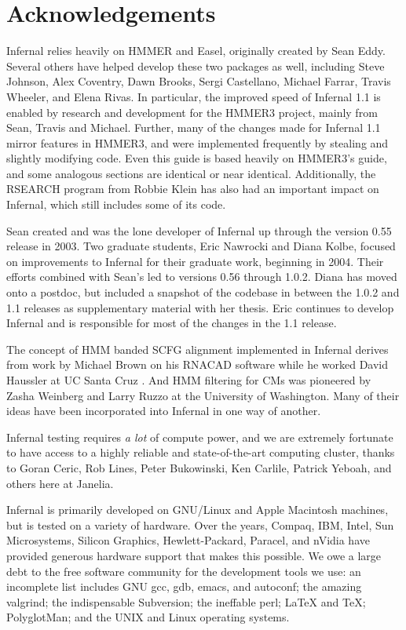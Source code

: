 \section{Acknowledgements}

Infernal relies heavily on HMMER and Easel, originally created by Sean
Eddy. Several others have helped develop these two packages as well,
including Steve Johnson, Alex Coventry, Dawn Brooks, Sergi Castellano,
Michael Farrar, Travis Wheeler, and Elena Rivas.  In particular, the
improved speed of Infernal 1.1 is enabled by research and development
for the HMMER3 project, mainly from Sean, Travis and Michael. Further,
many of the changes made for Infernal 1.1 mirror features in HMMER3,
and were implemented frequently by stealing and slightly modifying
code. Even this guide is based heavily on HMMER3's guide, and some
analogous sections are identical or near identical.  Additionally, the
RSEARCH program \citep{KleinEddy03} from Robbie Klein has also had an
important impact on Infernal, which still includes some of its code.

Sean created and was the lone developer of Infernal up through the
version 0.55 release in 2003. Two graduate students, Eric Nawrocki and
Diana Kolbe, focused on improvements to Infernal for their graduate
work, beginning in 2004. Their efforts combined with Sean's led to
versions 0.56 through 1.0.2. Diana has moved onto a postdoc, but
included a snapshot of the codebase in between the 1.0.2 and 1.1
releases as supplementary material with her thesis. Eric continues to
develop Infernal and is responsible for most of the changes in the 1.1
release.

The concept of HMM banded SCFG alignment implemented in Infernal
derives from work by Michael Brown on his RNACAD software while he
worked David Haussler at UC Santa Cruz \citep{Brown00}. And HMM
filtering for CMs was pioneered by Zasha Weinberg and Larry Ruzzo at
the University of Washington. Many of their ideas have been
incorporated into Infernal in one way of another. 

Infernal testing requires \emph{a lot} of compute power, and we are
extremely fortunate to have access to a highly reliable and
state-of-the-art computing cluster, thanks to Goran Ceric, Rob Lines,
Peter Bukowinski, Ken Carlile, Patrick Yeboah, and others here at
Janelia.

Infernal is primarily developed on GNU/Linux and Apple Macintosh
machines, but is tested on a variety of hardware. Over the years,
Compaq, IBM, Intel, Sun Microsystems, Silicon Graphics,
Hewlett-Packard, Paracel, and nVidia have provided generous hardware
support that makes this possible. We owe a large debt to the free
software community for the development tools we use: an incomplete
list includes GNU gcc, gdb, emacs, and autoconf; the amazing valgrind;
the indispensable Subversion; the ineffable perl; LaTeX and TeX;
PolyglotMan; and the UNIX and Linux operating systems.

\label{manualend}
